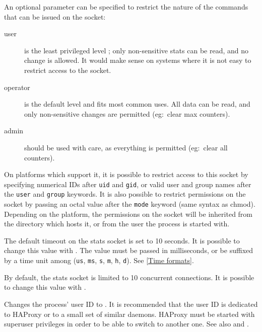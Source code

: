 \begin{keywords}
  An optional  parameter can be specified to restrict the nature of
  the commands that can be issued on the socket:
	\begin{description}
	\item[user] is the least privileged level ; only non-sensitive stats can be
      read, and no change is allowed. It would make sense on systems where it
      is not easy to restrict access to the socket.

	\item[operator] is the default level and fits most common uses. All data can
      be read, and only non-sensitive changes are permitted (eg:~clear max
      counters).

	\item[admin] should be used with care, as everything is permitted (eg:~clear
      all counters).
	\end{description}

  On platforms which support it, it is possible to restrict access to this
  socket by specifying numerical IDs after \verb"uid" and \verb"gid", or valid user and
  group names after the \verb"user" and \verb"group" keywords. It is also possible to
  restrict permissions on the socket by passing an octal value after the \verb"mode"
  keyword (same syntax as chmod). Depending on the platform, the permissions on
  the socket will be inherited from the directory which hosts it, or from the
  user the process is started with.

 

  The default timeout on the stats socket is set to 10 seconds. It is possible
  to change this value with . The value must be passed in
  milliseconds, or be suffixed by a time unit among
  (\texttt{us}, \texttt{ms}, \texttt{s}, \texttt{m}, \texttt{h}, \texttt{d}).
  See \autoref{Time formats}.

 

  By default, the stats socket is limited to 10 concurrent connections. It is
  possible to change this value with .

 

  Changes the process' user ID to . It is recommended that the user ID
  is dedicated to HAProxy or to a small set of similar daemons. HAProxy must
  be started with superuser privileges in order to be able to switch to another
  one. See also  and .


\end{keywords}
